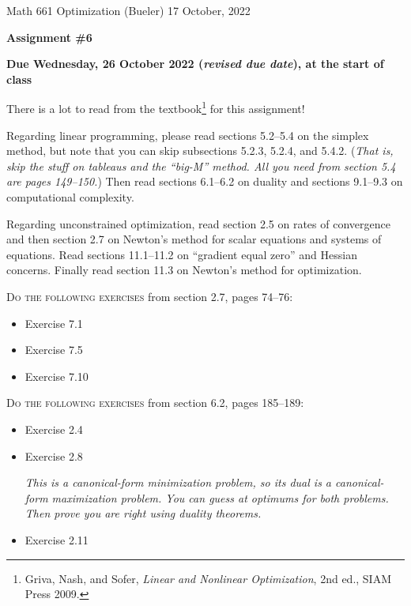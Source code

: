\documentclass[12pt]{amsart}
\begin{document}
\scriptsize \noindent Math 661 Optimization (Bueler) \hfill 17 October, 2022
\normalsize

\medskip\bigskip

\Large\centerline{\textbf{Assignment \#6}}
\large
\bigskip

\centerline{\textbf{Due Wednesday, 26 October 2022 (\emph{revised due date}), at the start of class}}
\bigskip
\normalsize

\thispagestyle{empty}

\bigskip
There is a lot to read from the textbook\footnote{Griva, Nash, and Sofer, \emph{Linear and Nonlinear Optimization}, 2nd ed., SIAM Press 2009.} for this assignment!

Regarding linear programming, please read sections 5.2--5.4 on the simplex method, but note that you can skip subsections 5.2.3, 5.2.4, and 5.4.2.  (\emph{That is, skip the stuff on tableaus and the ``big-M'' method.  All you need from section 5.4 are pages 149--150.})  Then read sections 6.1--6.2 on duality and sections 9.1--9.3 on computational complexity.

Regarding unconstrained optimization, read section 2.5 on rates of convergence and then section 2.7 on Newton's method for scalar equations and systems of equations.  Read sections 11.1--11.2 on ``gradient equal zero'' and Hessian concerns.  Finally read section 11.3 on Newton's method for optimization.

\bigskip
\noindent \textsc{Do the following exercises} from section 2.7, pages 74--76:

\begin{itemize}
\item Exercise 7.1
\item Exercise 7.5
\item Exercise 7.10
\end{itemize}

\bigskip
\noindent \textsc{Do the following exercises} from section 6.2, pages 185--189:

\begin{itemize}
\item Exercise 2.4
\item Exercise 2.8  \quad \begin{minipage}[t]{4.0in}
\emph{This is a canonical-form minimization problem, so its dual is a canonical-form maximization problem.  You can guess at optimums for both problems.  Then prove you are right using duality theorems.}
\end{minipage}
\item Exercise 2.11
\end{itemize}
\end{document}
